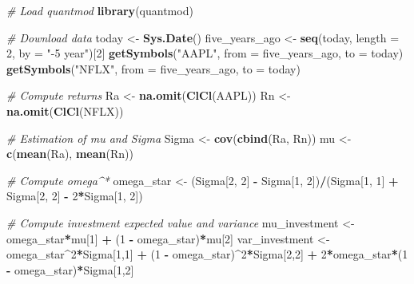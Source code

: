 \documentclass[12pt,]{krantz}
\newenvironment{Shaded}{\begin{snugshade}}{\end{snugshade}}
\newcommand{\KeywordTok}[1]{\textcolor[rgb]{0.27,0.27,0.27}{\textbf{#1}}}
\newcommand{\DataTypeTok}[1]{\textcolor[rgb]{0.27,0.27,0.27}{#1}}
\newcommand{\DecValTok}[1]{\textcolor[rgb]{0.06,0.06,0.06}{#1}}
\newcommand{\StringTok}[1]{\textcolor[rgb]{0.5,0.5,0.5}{#1}}
\newcommand{\CommentTok}[1]{\textcolor[rgb]{0.37,0.37,0.37}{\textit{#1}}}
\newcommand{\OperatorTok}[1]{\textcolor[rgb]{0.43,0.43,0.43}{\textbf{#1}}}
\newcommand{\NormalTok}[1]{#1}
\begin{document}
\begin{Shaded}
\begin{Highlighting}[]
\CommentTok{# Load quantmod}
\KeywordTok{library}\NormalTok{(quantmod)}

\CommentTok{# Download data}
\NormalTok{today <-}\StringTok{ }\KeywordTok{Sys.Date}\NormalTok{()}
\NormalTok{five_years_ago <-}\StringTok{ }\KeywordTok{seq}\NormalTok{(today, }\DataTypeTok{length =} \DecValTok{2}\NormalTok{, }\DataTypeTok{by =} \StringTok{"-5 year"}\NormalTok{)[}\DecValTok{2}\NormalTok{]}
\KeywordTok{getSymbols}\NormalTok{(}\StringTok{"AAPL"}\NormalTok{, }\DataTypeTok{from =}\NormalTok{ five_years_ago, }\DataTypeTok{to =}\NormalTok{ today)}
\KeywordTok{getSymbols}\NormalTok{(}\StringTok{"NFLX"}\NormalTok{, }\DataTypeTok{from =}\NormalTok{ five_years_ago, }\DataTypeTok{to =}\NormalTok{ today)}

\CommentTok{# Compute returns}
\NormalTok{Ra <-}\StringTok{ }\KeywordTok{na.omit}\NormalTok{(}\KeywordTok{ClCl}\NormalTok{(AAPL))}
\NormalTok{Rn <-}\StringTok{ }\KeywordTok{na.omit}\NormalTok{(}\KeywordTok{ClCl}\NormalTok{(NFLX)) }

\CommentTok{# Estimation of mu and Sigma}
\NormalTok{Sigma <-}\StringTok{ }\KeywordTok{cov}\NormalTok{(}\KeywordTok{cbind}\NormalTok{(Ra, Rn))}
\NormalTok{mu <-}\StringTok{ }\KeywordTok{c}\NormalTok{(}\KeywordTok{mean}\NormalTok{(Ra), }\KeywordTok{mean}\NormalTok{(Rn))}

\CommentTok{# Compute omega^*}
\NormalTok{omega_star <-}\StringTok{ }\NormalTok{(Sigma[}\DecValTok{2}\NormalTok{, }\DecValTok{2}\NormalTok{] }\OperatorTok{-}\StringTok{ }\NormalTok{Sigma[}\DecValTok{1}\NormalTok{, }\DecValTok{2}\NormalTok{])}\OperatorTok{/}\NormalTok{(Sigma[}\DecValTok{1}\NormalTok{, }\DecValTok{1}\NormalTok{] }\OperatorTok{+}\StringTok{ }\NormalTok{Sigma[}\DecValTok{2}\NormalTok{, }\DecValTok{2}\NormalTok{] }\OperatorTok{-}\StringTok{ }\DecValTok{2}\OperatorTok{*}\NormalTok{Sigma[}\DecValTok{1}\NormalTok{, }\DecValTok{2}\NormalTok{])}

\CommentTok{# Compute investment expected value and variance}
\NormalTok{mu_investment <-}\StringTok{ }\NormalTok{omega_star}\OperatorTok{*}\NormalTok{mu[}\DecValTok{1}\NormalTok{] }\OperatorTok{+}\StringTok{ }\NormalTok{(}\DecValTok{1} \OperatorTok{-}\StringTok{ }\NormalTok{omega_star)}\OperatorTok{*}\NormalTok{mu[}\DecValTok{2}\NormalTok{]}
\NormalTok{var_investment <-}\StringTok{ }\NormalTok{omega_star}\OperatorTok{^}\DecValTok{2}\OperatorTok{*}\NormalTok{Sigma[}\DecValTok{1}\NormalTok{,}\DecValTok{1}\NormalTok{] }\OperatorTok{+}\StringTok{ }\NormalTok{(}\DecValTok{1} \OperatorTok{-}\StringTok{ }\NormalTok{omega_star)}\OperatorTok{^}\DecValTok{2}\OperatorTok{*}\NormalTok{Sigma[}\DecValTok{2}\NormalTok{,}\DecValTok{2}\NormalTok{] }\OperatorTok{+}\StringTok{ }
\StringTok{  }\DecValTok{2}\OperatorTok{*}\NormalTok{omega_star}\OperatorTok{*}\NormalTok{(}\DecValTok{1} \OperatorTok{-}\StringTok{ }\NormalTok{omega_star)}\OperatorTok{*}\NormalTok{Sigma[}\DecValTok{1}\NormalTok{,}\DecValTok{2}\NormalTok{]}
\end{Highlighting}
\end{Shaded}
\end{document}
